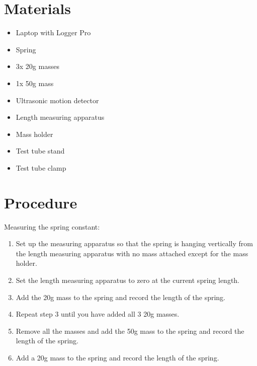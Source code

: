 \documentclass{article}
\begin{document}
    \section{Materials}\label{sec:materials}
        \begin{itemize}
            \item Laptop with Logger Pro
            \item Spring
            \item 3x 20g masses
            \item 1x 50g mass
            \item Ultrasonic motion detector
            \item Length measuring apparatus
            \item Mass holder
            \item Test tube stand %
            \item Test tube clamp
        \end{itemize}
    
    
    \section{Procedure}
        \noindent Measuring the spring constant:
        \begin{enumerate}
            \item Set up the measuring apparatus so that the spring is hanging vertically from the length measuring apparatus with no mass attached except for the mass holder.
            \item Set the length measuring apparatus to zero at the current spring length.
            \item Add the 20g mass to the spring and record the length of the spring.
            \item Repeat step 3 until you have added all 3 20g masses.
            \item Remove all the masses and add the 50g mass to the spring and record the length of the spring.
            \item Add a 20g mass to the spring and record the length of the spring.
        \end{enumerate}
        
\end{document}
